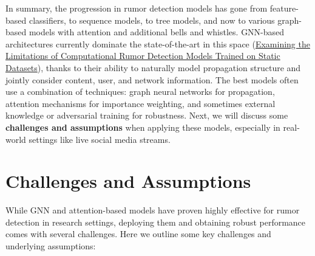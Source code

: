 \documentclass[12pt,a4paper]{report}
\begin{document}
In summary, the progression in rumor detection models has gone from feature-based classifiers, to sequence models, to tree models, and now to various graph-based models with attention and additional bells and whistles. GNN-based architectures currently dominate the state-of-the-art in this space (\href{https://arxiv.org/html/2309.11576v2#:~:text=to%20be%20modeled%20with%20contextual,54}{Examining the Limitations of Computational Rumor Detection Models Trained on Static Datasets}), thanks to their ability to naturally model propagation structure and jointly consider content, user, and network information. The best models often use a combination of techniques: graph neural networks for propagation, attention mechanisms for importance weighting, and sometimes external knowledge or adversarial training for robustness. Next, we will discuss some \textbf{challenges and assumptions} when applying these models, especially in real-world settings like live social media streams.

\chapter{Challenges and Assumptions}

While GNN and attention-based models have proven highly effective for rumor detection in research settings, deploying them and obtaining robust performance comes with several challenges. Here we outline some key challenges and underlying assumptions:
\end{document}
